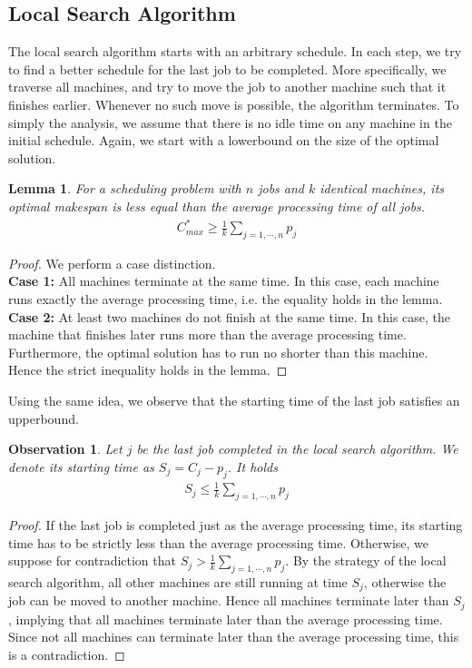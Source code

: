 \documentclass[11pt,psfig,times]{article}
\newtheorem{lemma}[theorem]{Lemma}
\newtheorem{observation}[theorem]{Observation}
\begin{document}
\subsection{Local Search Algorithm}
The local search algorithm starts with an arbitrary schedule. In each step, we try to find a better schedule for the last job to be completed. 
More specifically, we traverse all machines, and try to move the job to another machine such that it finishes earlier. 
Whenever no such move is possible, the algorithm terminates. To simply the analysis, we assume that there is no idle time on any machine in the initial schedule.  
Again, we start with a lowerbound on the size of the optimal solution. 
\begin{lemma}
    \label{lemma:lowerbound2}
    For a scheduling problem with $n$ jobs and $k$ identical machines, its optimal makespan is less equal than the average processing time of all jobs.
    \begin{align*}
        C_{max}^* \geq \frac{1}{k} \sum_{j=1, \cdots, n} p_j
    \end{align*} 
\end{lemma}
\begin{proof}
    We perform a case distinction.\\
        \textbf{Case 1:} All machines terminate at the same time. In this case, each machine runs exactly the average processing time, i.e. the equality holds in the lemma. \\
        \textbf{Case 2:} At least two machines do not finish at the same time. In this case, the machine that finishes later runs more than the average processing time. Furthermore, the optimal solution has to run no shorter than this machine. \\
        Hence the strict inequality holds in the lemma.
\end{proof}
Using the same idea, we observe that the starting time of the last job satisfies an upperbound. 
\begin{observation}
    \label{observation:upperbound}
    Let $j$ be the last job completed in the local search algorithm. We denote its starting time as $S_j = C_j - p_j$. It holds 
    \begin{align*}
        S_j \leq \frac{1}{k} \sum_{j=1, \cdots, n} p_j
    \end{align*}
\end{observation}
\begin{proof}
    If the last job is completed just as the average processing time, its starting time has to be strictly less than the average processing time. 
    Otherwise, we suppose for contradiction that $S_j > \frac{1}{k} \sum_{j=1, \cdots, n} p_j$. By the strategy of the local search algorithm,
    all other machines are still running at time $S_j$, otherwise the job can be moved to another machine. Hence all machines terminate 
    later than $S_j$, implying that all machines terminate later than the average processing time. Since not all machines can terminate later than 
    the average processing time, this is a contradiction. 
\end{proof}
\end{document}
